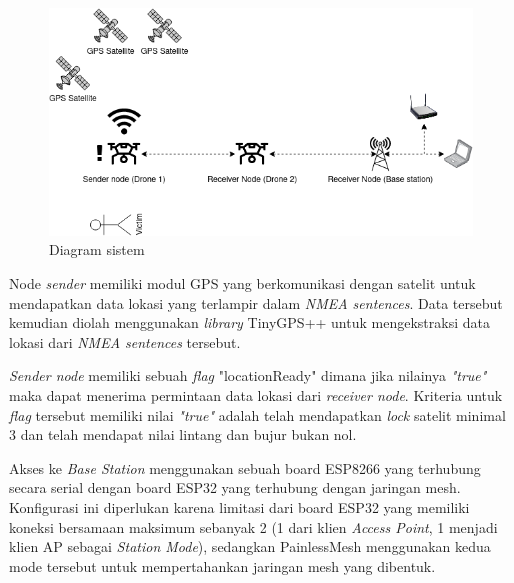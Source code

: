 \begin{figure}[h]
	\includegraphics[scale=0.5]{./assets/Diagram Sistem}
	\caption{Diagram sistem}
\end{figure}

Node \textit{sender} memiliki modul GPS yang berkomunikasi dengan satelit untuk mendapatkan data lokasi yang terlampir dalam \textit{NMEA sentences}. Data tersebut kemudian diolah menggunakan \textit{library} TinyGPS++ untuk mengekstraksi data lokasi dari \textit{NMEA sentences} tersebut.

\textit{Sender node} memiliki sebuah \textit{flag} "locationReady" dimana jika nilainya \textit{"true"} maka dapat menerima permintaan data lokasi dari \textit{receiver node}. Kriteria untuk \textit{flag} tersebut memiliki nilai \textit{"true"} adalah telah mendapatkan \textit{lock} satelit minimal 3 dan telah mendapat nilai lintang dan bujur bukan nol.

Akses ke \textit{Base Station} menggunakan sebuah board ESP8266 yang terhubung secara serial dengan board ESP32 yang terhubung dengan jaringan mesh. Konfigurasi ini diperlukan karena limitasi dari board ESP32 yang memiliki koneksi bersamaan maksimum sebanyak 2 (1 dari klien \textit{Access Point}, 1 menjadi klien AP sebagai \textit{Station Mode}), sedangkan PainlessMesh menggunakan kedua mode tersebut untuk mempertahankan jaringan mesh yang dibentuk.

